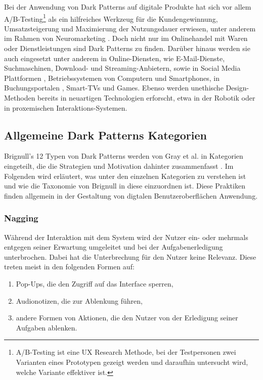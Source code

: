 \documentclass[a4paper]{article}
\begin{document}
Bei der Anwendung von Dark Patterns auf digitale Produkte hat sich vor allem A/B-Testing\footnote{\label{foot:1}A/B-Testing ist eine UX Research Methode, bei der Testpersonen zwei Varianten eines Prototypen gezeigt werden und daraufhin untersucht wird, welche Variante effektiver ist.} als ein hilfreiches Werkzeug für die Kundengewinnung, Umsatzsteigerung und Maximierung der Nutzungsdauer erwiesen, unter anderem im Rahmen von Neuromarketing \cite{snv}\cite{narayanan}\cite{tab}. Doch nicht nur im Onlinehandel mit Waren oder Dienstleistungen sind Dark Patterns zu finden. Darüber hinaus werden sie auch eingesetzt unter anderem in Online-Diensten, wie E-Mail-Dienste, Suchmaschinen, Download- und Streaming-Anbietern, sowie in Social Media Plattformen \cite{fastcompany}, Betriebssystemen von Computern und Smartphones, in Buchungsportalen \cite{swr}, Smart-TVs \cite{bundeskartellamt} und Games. Ebenso werden unethische Design-Methoden bereits in neuartigen Technologien erforscht, etwa in der Robotik oder in proxemischen Interaktions-Systemen.  

\subsection{Allgemeine Dark Patterns Kategorien}
\label{sub:dark_patterns_kategorien}
Brignull's 12 Typen von Dark Patterns werden von Gray et al. in Kategorien eingeteilt, die die Strategien und Motivation dahinter zusammenfasst \cite{gray}. 
Im Folgenden wird erläutert, was unter den einzelnen Kategorien zu verstehen ist und wie die Taxonomie von Brignull in diese einzuordnen ist. Diese Praktiken finden allgemein in der Gestaltung von digtalen Benutzeroberflächen Anwendung.

\subsubsection{Nagging}
\label{sssec:nagging}
Während der Interaktion mit dem System wird der Nutzer ein- oder mehrmals entgegen seiner Erwartung umgeleitet und bei der Aufgabenerledigung unterbrochen. Dabei hat die Unterbrechung für den Nutzer keine Relevanz. Diese treten meist in den folgenden Formen auf:
\begin{enumerate}[label=\arabic*)]
	\item{Pop-Ups, die den Zugriff auf das Interface sperren,}
	\item{Audionotizen, die zur Ablenkung führen,}
	\item{andere Formen von Aktionen, die den Nutzer von der Erledigung seiner Aufgaben ablenken.}
\end{enumerate}
\end{document}
